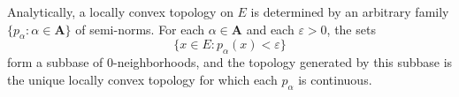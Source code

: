 Analytically, a locally convex topology on $E$ is determined by an arbitrary family $\{p_\alpha : \alpha \in \mathbf{A}\}$ of semi-norms. For each $\alpha \in \mathbf{A}$ and each $\varepsilon > 0$, the sets
$$\{x \in E : p_\alpha(x) < \varepsilon\}$$
form a subbase of $0$-neighborhoods, and the topology generated by this subbase is the unique locally convex topology for which each $p_\alpha$ is continuous.
